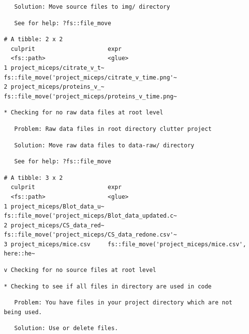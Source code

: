 \documentclass[12pt,twoside]{reedthesis}
\begin{document}
\begin{verbatim}
   Solution: Move source files to img/ directory
\end{verbatim}
\begin{verbatim}
   See for help: ?fs::file_move
\end{verbatim}
\begin{verbatim}
# A tibble: 2 x 2
  culprit                     expr                                              
  <fs::path>                  <glue>                                            
1 project_miceps/citrate_v_t~ fs::file_move('project_miceps/citrate_v_time.png'~
2 project_miceps/proteins_v_~ fs::file_move('project_miceps/proteins_v_time.png~
\end{verbatim}
\begin{verbatim}
* Checking for no raw data files at root level
\end{verbatim}
\begin{verbatim}
   Problem: Raw data files in root directory clutter project
\end{verbatim}
\begin{verbatim}
   Solution: Move raw data files to data-raw/ directory
\end{verbatim}
\begin{verbatim}
   See for help: ?fs::file_move
\end{verbatim}
\begin{verbatim}
# A tibble: 3 x 2
  culprit                     expr                                              
  <fs::path>                  <glue>                                            
1 project_miceps/Blot_data_u~ fs::file_move('project_miceps/Blot_data_updated.c~
2 project_miceps/CS_data_red~ fs::file_move('project_miceps/CS_data_redone.csv'~
3 project_miceps/mice.csv     fs::file_move('project_miceps/mice.csv', here::he~
\end{verbatim}
\begin{verbatim}
v Checking for no source files at root level
\end{verbatim}
\begin{verbatim}
* Checking to see if all files in directory are used in code
\end{verbatim}
\begin{verbatim}
   Problem: You have files in your project directory which are not being used.
\end{verbatim}
\begin{verbatim}
   Solution: Use or delete files.
\end{verbatim}
\end{document}
